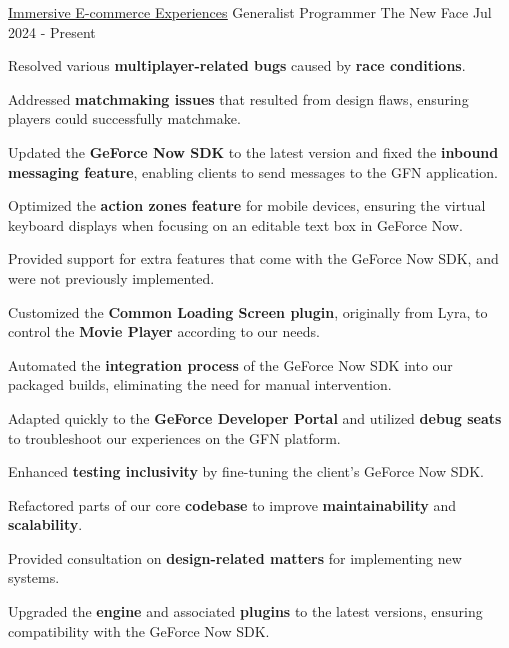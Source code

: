 

\begin{cventries}

  \cventry
    {\href{https://www.thenewface.io/}{\underline{Immersive E-commerce Experiences}}} %
    {Generalist Programmer} %
    {The New Face} %
    {Jul 2024 - Present} %
    {
      \begin{cvitems} %
        \item {Resolved various \textbf{multiplayer-related bugs} caused by \textbf{race conditions}.}
        \item {Addressed \textbf{matchmaking issues} that resulted from design flaws, ensuring players could successfully matchmake.}
        \item {Updated the \textbf{GeForce Now SDK} to the latest version and fixed the \textbf{inbound messaging feature}, enabling clients to send messages to the GFN application.}
        \item {Optimized the \textbf{action zones feature} for mobile devices, ensuring the virtual keyboard displays when focusing on an editable text box in GeForce Now.}
        \item {Provided support for extra features that come with the GeForce Now SDK, and were not previously implemented.}
        \item {Customized the \textbf{Common Loading Screen plugin}, originally from Lyra, to control the \textbf{Movie Player} according to our needs.}
        \item {Automated the \textbf{integration process} of the GeForce Now SDK into our packaged builds, eliminating the need for manual intervention.}
        \item {Adapted quickly to the \textbf{GeForce Developer Portal} and utilized \textbf{debug seats} to troubleshoot our experiences on the GFN platform.}
        \item {Enhanced \textbf{testing inclusivity} by fine-tuning the client's GeForce Now SDK.}
        \item {Refactored parts of our core \textbf{codebase} to improve \textbf{maintainability} and \textbf{scalability}.}
        \item {Provided consultation on \textbf{design-related matters} for implementing new systems.}
        \item {Upgraded the \textbf{engine} and associated \textbf{plugins} to the latest versions, ensuring compatibility with the GeForce Now SDK.}
      \end{cvitems}
    }


\end{cventries}
